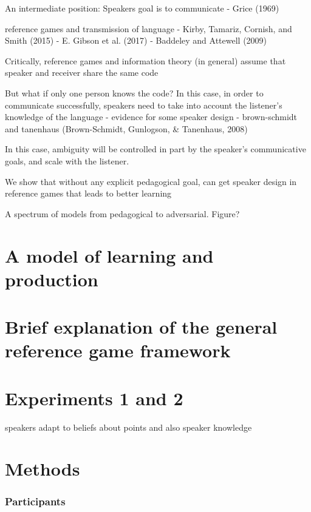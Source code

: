 \documentclass[english,floatsintext,man]{apa6}
\theoremstyle{definition}
\theoremstyle{definition}
\theoremstyle{definition}
\theoremstyle{remark}
\begin{document}
An intermediate position: Speakers goal is to communicate - Grice (1969)

reference games and transmission of language - Kirby, Tamariz, Cornish,
and Smith (2015) - E. Gibson et al. (2017) - Baddeley and Attewell
(2009)

Critically, reference games and information theory (in general) assume
that speaker and receiver share the same code

But what if only one person knows the code? In this case, in order to
communicate successfully, speakers need to take into account the
listener's knowledge of the language - evidence for some speaker design
- brown-schmidt and tanenhaus (Brown-Schmidt, Gunlogson, \& Tanenhaus,
2008)

In this case, ambiguity will be controlled in part by the speaker's
communicative goals, and scale with the listener.

We show that without any explicit pedagogical goal, can get speaker
design in reference games that leads to better learning

A spectrum of models from pedagogical to adversarial. Figure?

\section{A model of learning and
production}\label{a-model-of-learning-and-production}

\section{Brief explanation of the general reference game
framework}\label{brief-explanation-of-the-general-reference-game-framework}

\section{Experiments 1 and 2}\label{experiments-1-and-2}

speakers adapt to beliefs about points and also speaker knowledge

\section{Methods}\label{methods}

\subsubsection{Participants}\label{participants}
\end{document}
